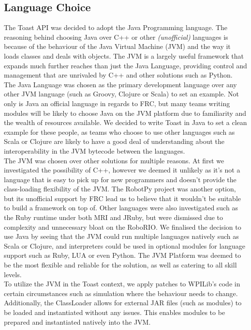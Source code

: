 \documentclass[a4paper,12pt]{article}
\begin{document}
\subsection{Language Choice}
The Toast API was decided to adopt the Java Programming language. The reasoning behind choosing Java over C++ or other \textit{(unofficial)} languages is because of the behaviour of the Java Virtual Machine (JVM) and the way it loads classes and deals with objects. The JVM is a largely useful framework that expands much further reaches than just the Java Language, providing control and management that are unrivaled by C++ and other solutions such as Python.\\

The Java Language was chosen as the primary development language over any other JVM language (such as Groovy, Clojure or Scala) to set an example. Not only is Java an official language in regards to FRC, but many teams writing modules will be likely to choose Java on the JVM platform due to familiarity and the wealth of resources available. We decided to write Toast in Java to set a clean example for these people, as teams who choose to use other languages such as Scala or Clojure are likely to have a good deal of understanding about the interoperability in the JVM bytecode between the languages.\\

The JVM was chosen over other solutions for multiple reasons. At first we investigated the possibility of C++, however we deemed it unlikely as it's not a language that is easy to pick up for new programmers and doesn't provide the class-loading flexibility of the JVM. The RobotPy project was another option, but its unofficial support by FRC lead us to believe that it wouldn't be suitable to build a framework on top of. Other languages were also investigated such as the Ruby runtime under both MRI and JRuby, but were dismissed due to complexity and unnecessary bloat on the RoboRIO. We finalised the decision to use Java by seeing that the JVM could run multiple languages natively such as Scala or Clojure, and interpreters could be used in optional modules for language support such as Ruby, LUA or even Python. The JVM Platform was deemed to be the most flexible and reliable for the solution, as well as catering to all skill levels.\\

To utilize the JVM in the Toast context, we apply patches to WPILib's code in certain circumstances such as simulation where the behaviour needs to change. Additionally, the ClassLoader allows for external JAR files (such as modules) to be loaded and instantiated without any issues. This enables modules to be prepared and instantiated natively into the JVM.\\
\end{document}
